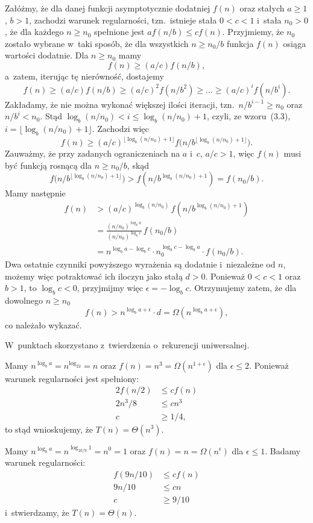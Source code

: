 \noindent Załóżmy, że dla danej funkcji asymptotycznie dodatniej $f(n)$ oraz stałych $a\ge1$, $b>1$, zachodzi warunek regularności, tzn.\ istnieje stała $0<c<1$ i~stała $n_0>0$, że dla każdego $n\ge n_0$ spełnione jest $af(n/b)\le cf(n)$. Przyjmiemy, że $n_0$ zostało wybrane w~taki sposób, że dla wszystkich $n\ge n_0/b$ funkcja $f(n)$ osiąga wartości dodatnie. Dla $n\ge n_0$ mamy
\[
	f(n) \ge (a/c)f(n/b),
\]
a~zatem, iterując tę nierówność, dostajemy
\[
	f(n) \ge (a/c)f(n/b) \ge (a/c)^2f(n/b^2) \ge \dots \ge (a/c)^if(n/b^i).
\]
Zakładamy, że nie można wykonać większej ilości iteracji, tzn.\ $n/b^{i-1}\ge n_0$ oraz $n/b^i<n_0$. Stąd $\log_b(n/n_0)<i\le\log_b(n/n_0)+1$, czyli, ze wzoru~(3.3), $i=\lfloor\log_b(n/n_0)+1\rfloor$. Zachodzi więc
\[
	f(n) \ge (a/c)^{\lfloor\log_b(n/n_0)+1\rfloor}f\bigl(n/b^{\lfloor\log_b(n/n_0)+1\rfloor}\bigr).
\]
Zauważmy, że przy zadanych ograniczeniach na $a$ i~$c$, $a/c>1$, więc $f(n)$ musi być funkcją rosnącą dla $n\ge n_0/b$, skąd
\[
	f\bigl(n/b^{\lfloor\log_b(n/n_0)+1\rfloor}\bigr) > f(n/b^{\log_b(n/n_0)+1}) = f(n_0/b).
\]
Mamy następnie
\begin{align*}
	f(n) &> (a/c)^{\log_b(n/n_0)}\,f(n/b^{\log_b(n/n_0)+1}) \\[1mm]
	&= \frac{(n/n_0)^{\log_ba}}{(n/n_0)^{\log_bc}}\,f(n_0/b) \\[1mm]
	&= n^{\log_ba-\log_bc}\cdot n_0^{\log_bc-\log_ba}\cdot f(n_0/b).
\end{align*}
Dwa ostatnie czynniki powyższego wyrażenia są dodatnie i~niezależne od $n$, możemy więc potraktować ich iloczyn jako stałą $d>0$. Ponieważ $0<c<1$ oraz $b>1$, to $\log_bc<0$, przyjmijmy więc $\epsilon=-\log_bc$. Otrzymujemy zatem, że dla dowolnego $n\ge n_0$
\[
	f(n) > n^{\log_ba+\epsilon}\cdot d = \Omega(n^{\log_ba+\epsilon}),
\]
co należało wykazać.

\problems

W~punktach  skorzystano z~twierdzenia o~rekurencji uniwersalnej.

\subproblem %
Mamy $n^{\log_ba}=n^{\log_22}=n$ oraz $f(n)=n^3=\Omega(n^{1+\epsilon})$ dla $\epsilon\le2$. Ponieważ warunek regularności jest spełniony:
\begin{align*}
	2f(n/2) &\le cf(n) \\
	2n^3\!/8 &\le cn^3 \\
	c &\ge 1/4,
\end{align*}
to stąd wnioskujemy, że $T(n)=\Theta(n^3)$.

\subproblem %
Mamy $n^{\log_ba}=n^{\log_{10/9}1}=n^0=1$ oraz $f(n)=n=\Omega(n^\epsilon)$ dla $\epsilon\le1$. Badamy warunek regularności:
\begin{align*}
	f(9n/10) &\le cf(n) \\
	9n/10 &\le cn \\
	c &\ge 9/10
\end{align*}
i~stwierdzamy, że $T(n)=\Theta(n)$.

